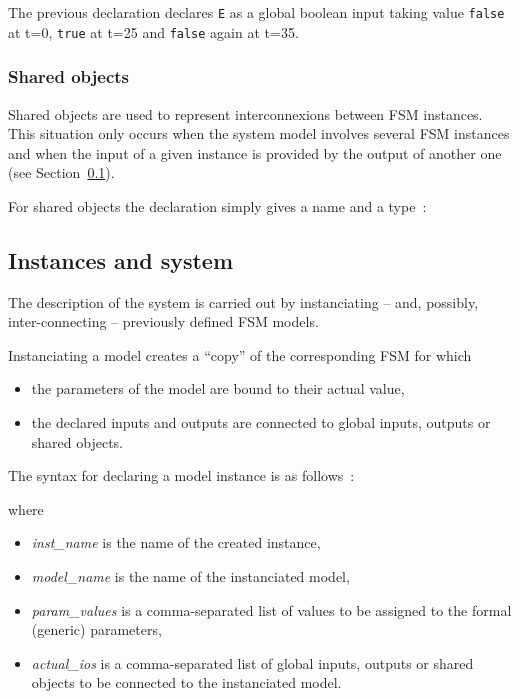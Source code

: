 The previous declaration declares \verb|E| as a global boolean input taking value \texttt{false} at
t=0, \texttt{true} at t=25 and \texttt{false} again at t=35.

\subsubsection*{Shared objects}
\label{sec:shared}

Shared objects are used to represent interconnexions between FSM instances. This situation only
occurs when the system model involves several FSM instances and when the input of a given instance
is provided by the output of another one (see Section~\ref{sec:fsm-instances}).

\step For shared objects the declaration simply gives a name and a type~:

\begin{center}
\end{center}

\subsection{Instances and system}
\label{sec:fsm-instances}

The description of the system is carried out by instanciating
-- and, possibly, inter-connecting -- previously defined FSM models.

\medskip
Instanciating a model creates a ``copy'' of the corresponding FSM for which
\begin{itemize}
\item the parameters of the model are bound to their actual value,
\item the declared inputs and outputs are connected to global inputs, outputs or shared
  objects.
\end{itemize}

\medskip
The syntax for declaring a model instance is as follows~:

\begin{center}
\end{center}

where
\begin{itemize}
\item \emph{inst\_name} is the name of the created instance,
\item \emph{model\_name} is the name of the instanciated model,
\item \emph{param\_values} is a comma-separated list of values to be assigned to the formal
  (generic) parameters,
\item \emph{actual\_ios} is a comma-separated list of global inputs, outputs or shared objects to be
  connected to the instanciated model.
\end{itemize}

